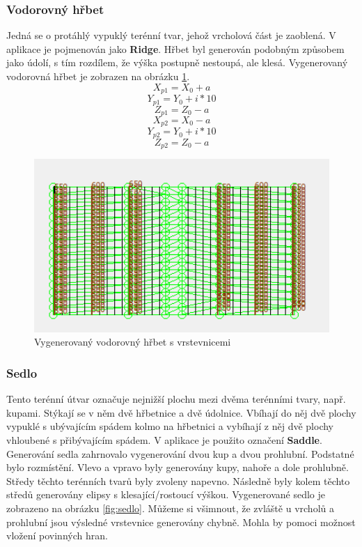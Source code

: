 \documentclass[a4paper,11pt,twoside]{article}
\begin{document}
\subsubsection{Vodorovný hřbet}
Jedná se o protáhlý vypuklý terénní tvar, jehož vrcholová část je zaoblená. V aplikace je pojmenován jako \textbf{Ridge}. Hřbet byl generován podobným způsobem jako údolí, s tím rozdílem, že výška postupně nestoupá, ale klesá.  Vygenerovaný vodorovná hřbet je zobrazen na obrázku \ref{fig:hrbet}.
$$
X_{p1} = X_0 + a
$$
$$
Y_{p1} = Y_0 + i * 10
$$
$$
Z_{p1} = Z_0 - a
$$
$$
X_{p2} = X_0 - a
$$
$$
Y_{p2} = Y_0 + i * 10
$$
$$
Z_{p2} = Z_0 - a
$$

\vspace{0.2cm}
\begin{figure}[hbt!] 
\begin{center}
\includegraphics[width=12cm]{pictures/hrbet.PNG} 
\caption[Vygenerovaný vodorovný hřbet s vrstevnicemi]{Vygenerovaný vodorovný hřbet s vrstevnicemi}
\label{fig:hrbet}
\end{center}
\end{figure}

\subsubsection{Sedlo}
Tento terénní útvar označuje nejnižší plochu mezi dvěma terénními tvary, např. kupami. Stýkají se v něm dvě hřbetnice a dvě údolnice. Vbíhají do něj dvě plochy vypuklé s ubývajícím spádem kolmo na hřbetnici a vybíhají z něj dvě plochy vhloubené s přibývajícím spádem. V aplikace je použito označení \textbf{Saddle}. \\
\indent Generování sedla zahrnovalo vygenerování dvou kup a dvou prohlubní. Podstatné bylo rozmístění. Vlevo a vpravo byly generovány kupy, nahoře a dole prohlubně. Středy těchto terénních tvarů byly zvoleny napevno. Následně byly kolem těchto středů generovány elipsy s klesající/rostoucí výškou. Vygenerované sedlo je zobrazeno na obrázku \ref{fig:sedlo}. Můžeme si všimnout, že zvláště u vrcholů a prohlubní jsou výsledné vrstevnice generovány chybně. Mohla by pomoci možnost vložení povinných hran.\\
\end{document}
